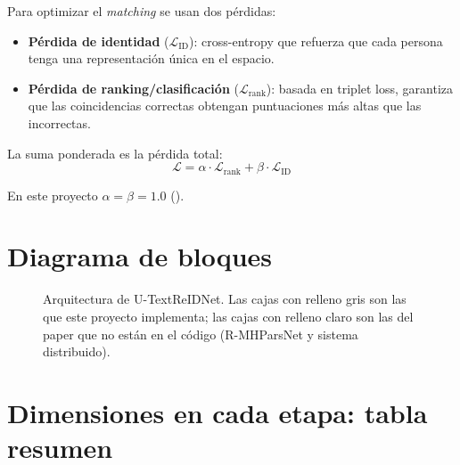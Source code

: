Para optimizar el \emph{matching} se usan dos pérdidas:

\begin{itemize}
  \item \textbf{Pérdida de identidad} ($\mathcal{L}_{\text{ID}}$):
        cross-entropy que refuerza que cada persona tenga una
        representación única en el espacio.
  \item \textbf{Pérdida de ranking/clasificación}
        ($\mathcal{L}_{\text{rank}}$): basada en triplet loss,
        garantiza que las coincidencias correctas obtengan
        puntuaciones más altas que las incorrectas.
\end{itemize}

\noindent La suma ponderada es la pérdida total:
\begin{equation}
  \mathcal{L} = \alpha \cdot \mathcal{L}_{\text{rank}}
              + \beta  \cdot \mathcal{L}_{\text{ID}}
\end{equation}

\noindent En este proyecto $\alpha = \beta = 1.0$
().

\section{Diagrama de bloques}

\begin{figure}[H]
\centering

\caption{Arquitectura de U-TextReIDNet. Las cajas con relleno gris
son las que este proyecto implementa; las cajas con relleno claro
son las del paper que no están en el código (R-MHParsNet y sistema
distribuido).}
\label{fig:arquitectura}
\end{figure}

\section{Dimensiones en cada etapa: tabla resumen}

